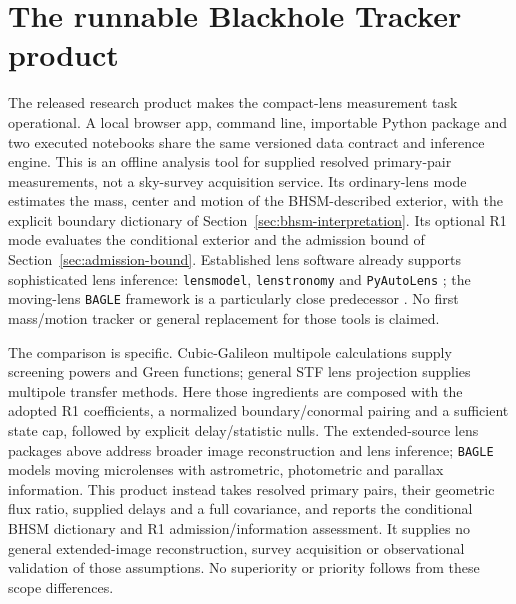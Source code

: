 \section{The runnable Blackhole Tracker product}
\label{sec:product}

The released research product makes the compact-lens measurement task
operational. A local browser app, command line, importable Python package
and two executed notebooks share the same versioned data contract and
inference engine. This is an offline analysis tool for supplied resolved
primary-pair measurements, not a sky-survey acquisition service. Its
ordinary-lens mode estimates the mass, center and motion of the
BHSM-described exterior, with the explicit boundary dictionary of
Section~\ref{sec:bhsm-interpretation}. Its optional R1 mode evaluates the
conditional exterior and the admission bound of
Section~\ref{sec:admission-bound}. Established lens software already
supports sophisticated lens inference: \texttt{lensmodel},
\texttt{lenstronomy} and \texttt{PyAutoLens}
\cite{Keeton2001,Birrer2018,Nightingale2021}; the moving-lens
\texttt{BAGLE} framework is a particularly close predecessor
\cite{Lu2025}. No first mass/motion tracker or general replacement for
those tools is claimed.

The comparison is specific. Cubic-Galileon multipole calculations
\cite{Chu2013,Brito2014} supply screening powers and Green functions;
general STF lens projection \cite{Turyshev2022} supplies multipole
transfer methods. Here those ingredients are composed with the adopted
R1 coefficients, a normalized boundary/conormal pairing and a sufficient
state cap, followed by explicit delay/statistic nulls. The extended-source
lens packages above address broader image reconstruction and lens
inference; \texttt{BAGLE} models moving microlenses with astrometric,
photometric and parallax information. This product instead takes
resolved primary pairs, their geometric flux ratio, supplied delays and
a full covariance, and reports the conditional BHSM dictionary and R1
admission/information assessment. It supplies no general extended-image
reconstruction, survey acquisition or observational validation of those
assumptions. No superiority or priority follows from these scope differences.

